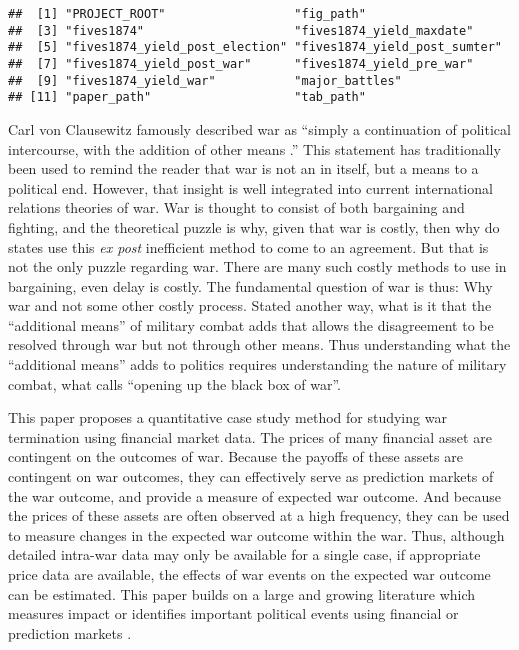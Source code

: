 \begin{knitrout}
\color{fgcolor}\begin{kframe}
\begin{verbatim}
##  [1] "PROJECT_ROOT"                  "fig_path"                     
##  [3] "fives1874"                     "fives1874_yield_maxdate"      
##  [5] "fives1874_yield_post_election" "fives1874_yield_post_sumter"  
##  [7] "fives1874_yield_post_war"      "fives1874_yield_pre_war"      
##  [9] "fives1874_yield_war"           "major_battles"                
## [11] "paper_path"                    "tab_path"
\end{verbatim}
\end{kframe}
\end{knitrout}

Carl von Clausewitz famously described war as ``simply a continuation of political intercourse, with the addition of other means \parencite[605]{Clausewitz1989}.'' %
This statement has traditionally been used to remind the reader that
war is not an in itself, but a means to a political end. %
However, that insight is well integrated into current international relations theories of war. %
War is thought to consist of both bargaining and fighting, and the theoretical puzzle is why, given that war is costly, then why do states use this \textit{ex post} inefficient method to come to an agreement. %
But that is not the only puzzle regarding war. %
There are many such costly methods to use in bargaining, even delay is costly. %
The fundamental question of war is thus: Why war and not some other costly process. %
Stated another way, what is it that the ``additional means'' of military combat adds that allows the disagreement to be resolved through war but not through other means. %
Thus understanding what the ``additional means'' adds to politics requires understanding the nature of military combat, what \textcite{Gartner1998} calls ``opening up the black box of war''.

This paper proposes a quantitative case study method for studying war termination using financial market data. The prices of many financial asset are contingent on the outcomes of war. Because the payoffs of these assets are contingent on war outcomes, they can effectively serve as prediction markets of the war outcome, and provide a measure of expected war outcome. And because the prices of these assets are often observed at a high frequency, they can be used to measure changes in the expected war outcome within the war. Thus, although
detailed intra-war data may only be available for a single case, if
appropriate price data are available, the effects of war events on the
expected war outcome can be estimated. This paper builds on a large and
growing literature which measures impact or identifies important
political events using financial
\parencites{NorthWeingast1989}{north2000introd}{FreyKucher2000}{sussman2000instit}{wells2000revol}{Herron2000}{eldor2004finan}{ChenSiems2004}{Greenstone2007}
or prediction
markets \parencites{WolfersZitzewitz2004}{ArrowForsytheGorhamEtAl2008}{WolfersZitzewitz2009}.



